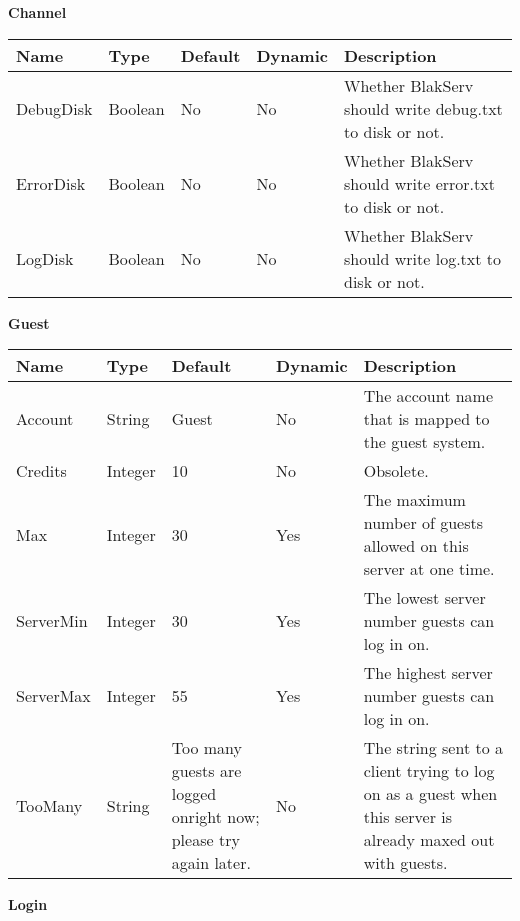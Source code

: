 \begin{center}
\textbf{Channel} \par

\begin{tabular}{|l|l|l|l|p{3.7in}|} \hline
Name & Type & Default & Dynamic & Description 
\\ \hline
DebugDisk & Boolean & No & No & Whether BlakServ should write debug.txt to disk or not.
\\ \hline 
ErrorDisk & Boolean & No & No & Whether BlakServ should write error.txt to disk or not.
\\ \hline 
LogDisk & Boolean & No & No & Whether BlakServ should write log.txt to disk or not.
\\ \hline
\end{tabular}

\textbf{Guest} \par

\begin{tabular}{|l|l|p{1.5in}|l|p{2.8in}|} \hline
Name & Type & Default & Dynamic & Description 
\\ \hline
Account & String & Guest & No & The account name that is mapped to the guest system.
\\ \hline 
Credits & Integer & 10 & No & Obsolete.
\\ \hline 
Max & Integer & 30 & Yes & The maximum number of guests allowed on this server at one time.
\\ \hline
ServerMin & Integer & 30 & Yes & The lowest server number guests can log in on.
\\ \hline
ServerMax & Integer & 55 & Yes & The highest server number guests can log in on.
\\ \hline
TooMany & String & Too many guests are logged onright now; please try again later. &
No & The string sent to a client trying to log on as a guest when this server is already
maxed out with guests.
\\ \hline
\end{tabular}


\textbf{Login} \par


\end{center}
